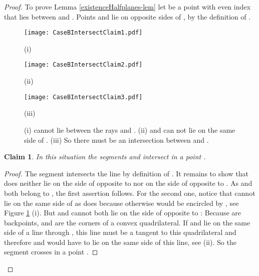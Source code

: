\documentclass[11pt]{article}
\newtheorem{claim}{Claim}
\begin{document}
 
\begin{proof}
To prove Lemma \ref{existenceHalfplanes-lem} let  be a point with even index that lies between  and . Points  and  lie on opposite sides of , by the definition of .

\begin{figure}[hbtp]\begin{minipage}[t]{0.30\textwidth}
\begin{center}\texttt{[image: CaseBIntersectClaim1.pdf]}

(i)
\end{center}\end{minipage}
\hfill
\begin{minipage}[t]{0.23\textwidth}
\begin{center}\texttt{[image: CaseBIntersectClaim2.pdf]}

(ii)
\end{center}\end{minipage}
\hfill
\begin{minipage}[t]{0.28\textwidth}
\begin{center}\texttt{[image: CaseBIntersectClaim3.pdf]}

(iii)
\end{center}\end{minipage}
\caption{(i)  cannot lie between the rays  and . 
(ii)  and  can not lie on the same side of .
(iii) So there must be an intersection between  and .}
\label{CaseBIntersectClaim-fig}
\end{figure}

\begin{claim}In this situation the segments  and  intersect in a point . 
\end{claim}

\begin{proof}The segment  intersects the line  by definition of . It remains to show that  does neither lie on the side of  opposite to  nor on the side of  opposite to .
As  and  both belong to , the first assertion follows.
For the second one, notice that  cannot lie on the same side of  as  does because otherwise   would be encircled by , see Figure \ref{CaseBIntersectClaim-fig} (i). But  and  cannot both lie on the side of  opposite to : Because  are backpoints,  and  are the corners of a convex quadrilateral. If  and  lie on the same side of a line through , this line must be a tangent to this quadrilateral and therefore  and  would have to lie on the same side of this line, see (ii).
So the segment  crosses  in a point .
\end{proof}



\end{proof}
\end{document}
